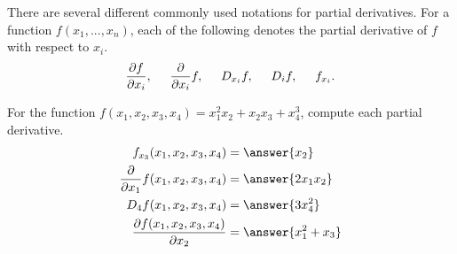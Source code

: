 \documentclass{ximera}
\begin{document}
There are several different commonly used notations for partial derivatives. For a function $f(x_1,...,x_n)$, each of the following denotes the partial derivative of $f$ with respect to $x_i$.
\[
\frac{\partial f}{\partial x_i},\hspace{.5cm} \frac{\partial}{\partial x_i} f, \hspace{.5cm} D_{x_i}f, \hspace{.5cm} D_i f, \hspace{.5cm} f_{x_i}.
\]

\begin{problem}
For the function $f(x_1,x_2,x_3,x_4) = x_1^2x_2+x_2x_3+x_4^3$, compute each partial derivative.
\begin{align*}
f_{x_3}(x_1,x_2,x_3,x_4) &= \answer{x_2}\\
\frac{\partial}{\partial x_1} f(x_1,x_2,x_3,x_4) &= \answer{2x_1x_2}\\
D_4 f(x_1,x_2,x_3,x_4) &= \answer{3x_4^2}\\
\frac{\partial f(x_1,x_2,x_3,x_4)}{\partial x_2} &= \answer{x_1^2+x_3}
\end{align*}
\end{problem}
\end{document}
